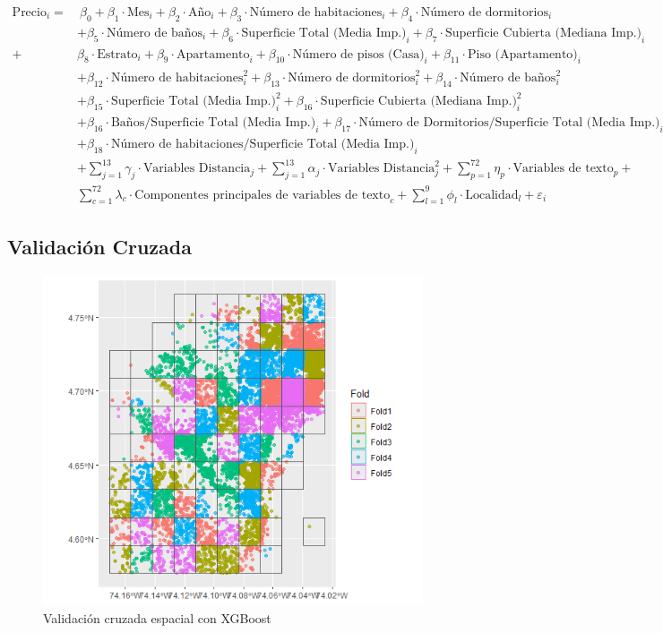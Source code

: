 \documentclass[a4paper]{article}
\theoremstyle{remark}
\theoremstyle{definition}
\begin{document}
\begin{align*}
\text{Precio}_i = &\ \beta_0 + \beta_1 \cdot \text{Mes}_i + \beta_2 \cdot \text{Año}_i + \beta_3 \cdot \text{Número de habitaciones}_i + \beta_4 \cdot \text{Número de dormitorios}_i \\
& + \beta_5 \cdot \text{Número de baños}_i + \beta_6 \cdot \text{Superficie Total (Media Imp.)}_i + \beta_7 \cdot \text{Superficie Cubierta (Mediana Imp.)}_i \\ +  & \beta_8 \cdot \text{Estrato}_i + \beta_9 \cdot \text{Apartamento}_i + \beta_{10} \cdot \text{Número de pisos (Casa)}_i + \beta_{11} \cdot \text{Piso (Apartamento)}_i \\
&  + \beta_{12} \cdot \text{Número de habitaciones}_i^2 + \beta_{13} \cdot \text{Número de dormitorios}_i^2 + \beta_{14} \cdot \text{Número de baños}_i^2 \\
& + \beta_{15} \cdot \text{Superficie Total (Media Imp.)}_i^2 + \beta_{16} \cdot \text{Superficie Cubierta (Mediana Imp.)}_i^2  \\
& + \beta_{16} \cdot \text{Baños/Superficie Total (Media Imp.)}_i+ \beta_{17} \cdot \text{Número de Dormitorios/Superficie Total (Media Imp.)}_i \\
& + \beta_{18} \cdot \text{Número de habitaciones/Superficie Total (Media Imp.)}_i \\
& + \sum_{j=1}^{13} \gamma_j \cdot \text{Variables Distancia}_j +  \sum_{j=1}^{13} \alpha_j \cdot \text{Variables Distancia}_j^2 + \sum_{p=1}^{72} \eta_p \cdot \text{Variables de texto}_p + \\
& \sum_{c=1}^{72} \lambda_c \cdot \text{Componentes principales de variables de texto}_c +  \sum_{l=1}^{9} \phi_l \cdot \text{Localidad}_l+ \varepsilon_i
\end{align*}


\subsection{Validación Cruzada}
\begin{figure}[H]
    \centering
    \caption{Validación cruzada espacial con XGBoost}
    \includegraphics[width=0.75\linewidth]{Graficas/Validacion_Cruzada_Espacial.png}
\end{figure}
\end{document}
